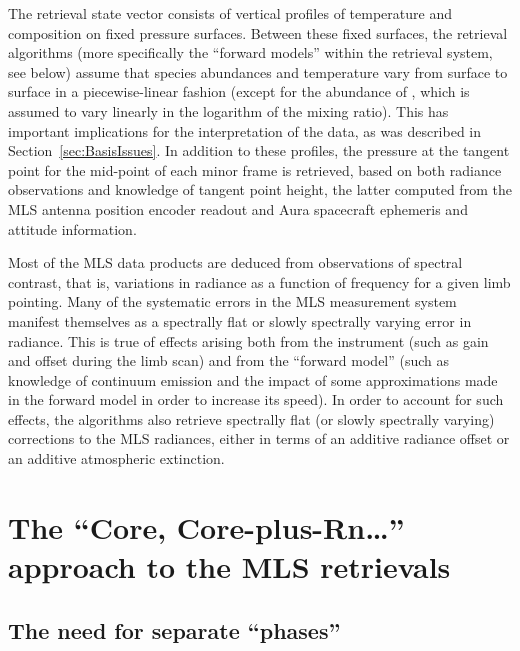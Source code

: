 The retrieval state vector consists of vertical profiles of temperature and composition on fixed pressure surfaces. Between these fixed surfaces, the retrieval algorithms (more specifically the ``forward models'' within the retrieval system, see below) assume that species abundances and temperature vary from surface to surface in a piecewise-linear fashion (except for the abundance of , which is assumed to vary linearly in the logarithm of the mixing ratio). This has important implications for the interpretation of the data, as was described in Section~\ref{sec:BasisIssues}. In addition to these profiles, the pressure at the tangent point for the mid-point of each minor frame is retrieved, based on both radiance observations and knowledge of tangent point height, the latter computed from the MLS antenna position encoder readout and Aura spacecraft ephemeris and attitude information.

Most of the MLS data products are deduced from observations of spectral contrast, that is, variations in radiance as a function of frequency for a given limb pointing. Many of the systematic errors in the MLS measurement system manifest themselves as a spectrally flat or slowly spectrally varying error in radiance. This is true of effects arising both from the instrument (such as gain and offset during the limb scan) and from the ``forward model'' (such as knowledge of continuum emission and the impact of some approximations made in the forward model in order to increase its speed). In order to account for such effects, the \thisv algorithms also retrieve spectrally flat (or slowly spectrally varying) corrections to the MLS radiances, either in terms of an additive radiance offset or an additive atmospheric extinction.

\section{The ``Core, Core-plus-Rn\ldots'' approach to the MLS retrievals}

\subsection{The need for separate ``phases''}

